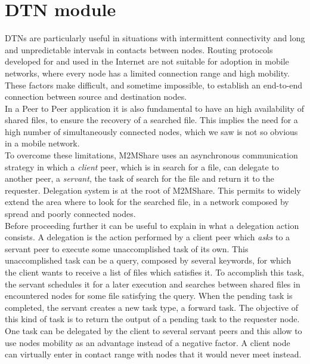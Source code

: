 %

\section{DTN module}
DTNs are particularly useful in situations with intermittent connectivity and long and unpredictable intervals in contacts between nodes. Routing protocols developed for and used in the Internet are not suitable for adoption in mobile networks, where every node has a limited connection range and high mobility. These factors make difficult, and sometime impossible, to establish an end-to-end connection between source and destination nodes.
\\

In a Peer to Peer application it is also fundamental to have an high availability of shared files, to ensure the recovery of a searched file. This implies the need for a high number of simultaneously connected nodes, which we saw is not so obvious in a mobile network.
\\

To overcome these limitations, M2MShare uses an asynchronous communication strategy in which a \textit{client} peer, which is in search for a file, can delegate to another peer, a \textit{servant}, the task of search for the file and return it to the requester. Delegation system is at the root of M2MShare. This permits to widely extend the area where to look for the searched file, in a network composed by spread and poorly connected nodes.
\\

Before proceeding further it can be useful to explain in what a delegation action consists. A delegation is the action performed by a client peer which \textit{asks} to a servant peer to execute some unaccomplished task of its own. This unaccomplished task can be a query, composed by several keywords, for which the client wants to receive a list of files which satisfies it. To accomplish this task, the servant schedules it for a later execution and searches between shared files in encountered nodes for some file satisfying the query. When the pending task is completed, the servant creates a new task type, a forward task. The objective of this kind of task is to return the output of a pending task to the requester node.
\\
One task can be delegated by the client to several servant peers and this allow to use nodes mobility as an advantage instead of a negative factor. A client node can virtually enter in contact range with nodes that it would never meet instead. 
\\

